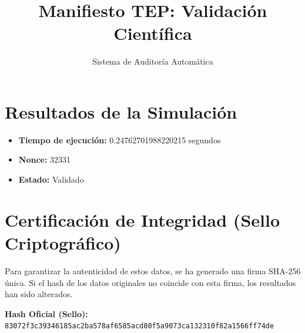 \documentclass[11pt,a4paper]{article}
\begin{document}
\title{Manifiesto TEP: Validación Científica}
\author{Sistema de Auditoría Automática}
\maketitle

\section*{Resultados de la Simulación}
\begin{itemize}
    \item \textbf{Tiempo de ejecución:} 0.24762701988220215 segundos
    \item \textbf{Nonce:} 32331
    \item \textbf{Estado:} Validado
\end{itemize}

\section*{Certificación de Integridad (Sello Criptográfico)}
Para garantizar la autenticidad de estos datos, se ha generado una firma SHA-256 única. 
Si el hash de los datos originales no coincide con esta firma, los resultados han sido alterados.

\textbf{Hash Oficial (Sello):}
\vspace{0.3cm}
\texttt{83072f3c39346185ac2ba578af6585acd80f5a9073ca132310f82a1566ff74de}
\end{document}
